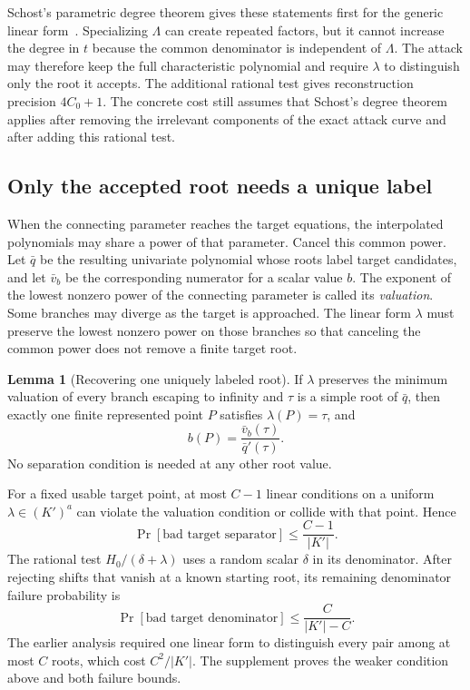 \documentclass[11pt,a4paper]{article}
\theoremstyle{definition}
\newtheorem{lemma}[theorem]{Lemma}
\theoremstyle{remark}
\begin{document}
Schost's parametric degree theorem gives these statements first for the generic
linear form~\cite{Schost2003}.  Specializing $\Lambda$ can create repeated
factors, but it cannot increase the degree in $t$ because the common
denominator is independent of $\Lambda$.  The attack may therefore keep the
full characteristic polynomial and require $\lambda$ to distinguish only the
root it accepts.  The additional rational test gives reconstruction precision
$4C_0+1$.  The concrete cost still assumes that Schost's degree theorem
applies after removing the irrelevant components of the exact attack curve
and after adding this rational test.

\subsection{Only the accepted root needs a unique label}\label{sec:local}

When the connecting parameter reaches the target equations, the interpolated
polynomials may share a power of that parameter.  Cancel this common power.
Let $\bar q$ be the resulting univariate polynomial whose roots label target
candidates, and let $\bar v_b$ be the corresponding numerator for a scalar
value $b$.  The exponent of the lowest nonzero power of the connecting
parameter is called its \emph{valuation}.  Some branches may diverge as the
target is approached.  The linear form $\lambda$ must preserve the lowest
nonzero power on those branches
so that canceling the common power does not remove a finite target root.

\begin{lemma}[Recovering one uniquely labeled root]\label{lem:simple}
If $\lambda$ preserves the minimum valuation of every branch escaping to
infinity and $\tau$ is a simple root of $\bar q$, then exactly one finite
represented point $P$ satisfies $\lambda(P)=\tau$, and
\[
 b(P)=\frac{\bar v_b(\tau)}{\bar q'(\tau)}.
\]
No separation condition is needed at any other root value.
\end{lemma}

For a fixed usable target point, at most $C-1$ linear conditions on a uniform
$\lambda\in(K')^a$ can violate the valuation condition or collide with that
point.  Hence
\begin{equation}\label{eq:lambdafail}
 \Pr[\text{bad target separator}]\le\frac{C-1}{|K'|}.
\end{equation}
The rational test $H_0/(\delta+\lambda)$ uses a random scalar $\delta$ in its denominator.
After rejecting shifts that vanish at a known starting root, its remaining
denominator failure probability is
\begin{equation}\label{eq:cfail}
 \Pr[\text{bad target denominator}]\le\frac{C}{|K'|-C}.
\end{equation}
The earlier analysis required one linear form to distinguish every pair among
at most $C$ roots, which cost $C^2/|K'|$.  The supplement proves the weaker
condition above and both failure bounds.
\end{document}
